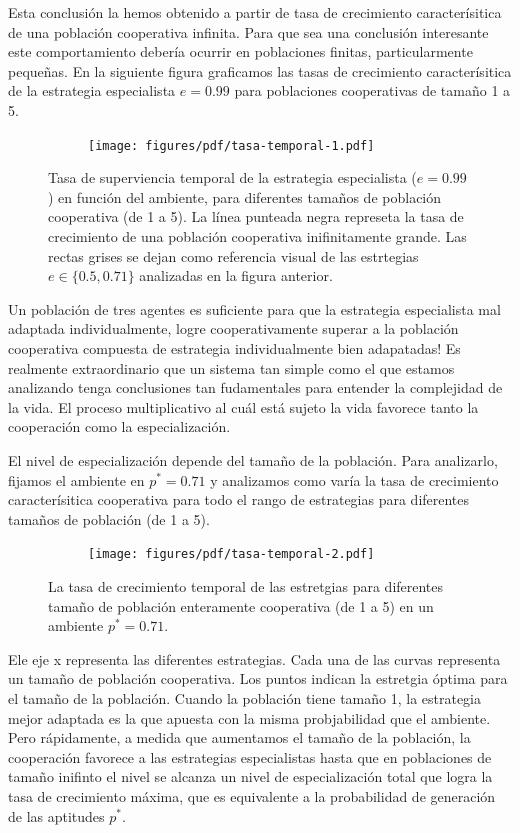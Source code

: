 \documentclass[a4paper,10pt]{article}
\begin{document}
Esta conclusión la hemos obtenido a partir de tasa de crecimiento caracterísitica de una población cooperativa infinita.
Para que sea una conclusión interesante este comportamiento debería ocurrir en poblaciones finitas, particularmente pequeñas.
En la siguiente figura graficamos las tasas de crecimiento caracterísitica de la estrategia especialista $e=0.99$ para poblaciones cooperativas de tamaño 1 a 5.
%
\begin{figure}[H]
    \centering
    \begin{subfigure}[b]{0.66\textwidth}
    \texttt{[image: figures/pdf/tasa-temporal-1.pdf]}
    \end{subfigure}
    \caption{
    Tasa de superviencia temporal de la estrategia especialista ($e=0.99$) en función del ambiente, para diferentes tamaños de población cooperativa (de 1 a 5).
    La línea punteada negra represeta la tasa de crecimiento de una población cooperativa inifinitamente grande.
    Las rectas grises se dejan como referencia visual de las estrtegias $e \in \{0.5, 0.71\}$ analizadas en la figura anterior.
    }
    \label{fig:multilevel-selection-1}
\end{figure}
%
Un población de tres agentes es suficiente para que la estrategia especialista mal adaptada individualmente, logre cooperativamente superar a la población cooperativa compuesta de estrategia individualmente bien adapatadas!
Es realmente extraordinario que un sistema tan simple como el que estamos analizando tenga conclusiones tan fudamentales para entender la complejidad de la vida.
El proceso multiplicativo al cuál está sujeto la vida favorece tanto la cooperación como la especialización.


El nivel de especialización depende del tamaño de la población.
Para analizarlo, fijamos el ambiente en $p^* = 0.71$ y analizamos como varía la tasa de crecimiento caracterísitica cooperativa para todo el rango de estrategias para diferentes tamaños de población (de 1 a 5).
%
\begin{figure}[H]
    \centering
    \begin{subfigure}[b]{0.66\textwidth}
    \texttt{[image: figures/pdf/tasa-temporal-2.pdf]}
    \end{subfigure}
    \caption{
    La tasa de crecimiento temporal de las estretgias para diferentes tamaño de población enteramente cooperativa (de 1 a 5) en un ambiente $p^*=0.71$.
    }
    \label{fig:multilevel-selection-1}
\end{figure}
%
Ele eje x representa las diferentes estrategias.
Cada una de las curvas representa un tamaño de población cooperativa.
Los puntos indican la estretgia óptima para el tamaño de la población.
Cuando la población tiene tamaño 1, la estrategia mejor adaptada es la que apuesta con la misma probjabilidad que el ambiente.
Pero rápidamente, a medida que aumentamos el tamaño de la población, la cooperación favorece a las estrategias especialistas hasta que en poblaciones de tamaño inifinto el nivel se alcanza un nivel de especialización total que logra la tasa de crecimiento máxima, que es equivalente a la probabilidad de generación de las aptitudes $p^*$.
\end{document}
